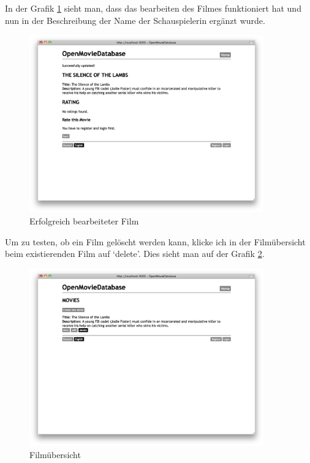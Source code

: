 In der Grafik \ref{test_movie_04} sieht man, dass das bearbeiten des Filmes
funktioniert hat und nun in der Beschreibung der Name der Schauspielerin ergänzt
wurde.

\begin{figure}[ht]
    \begin{center}
        \includegraphics[width=0.9\textwidth,angle=0]{./bilder/tests/test_movie_04.png}
        \caption{Erfolgreich bearbeiteter Film}
        \label{test_movie_04}
    \end{center}
\end{figure}

\clearpage

Um zu testen, ob ein Film gelöscht werden kann, klicke ich in der Filmübersicht
beim existierenden Film auf `delete'. Dies sieht man auf der Grafik \ref{test_movie_05}.

\begin{figure}[ht]
    \begin{center}
        \includegraphics[width=0.9\textwidth,angle=0]{./bilder/tests/test_movie_05.png}
        \caption{Filmübersicht}
        \label{test_movie_05}
    \end{center}
\end{figure}

